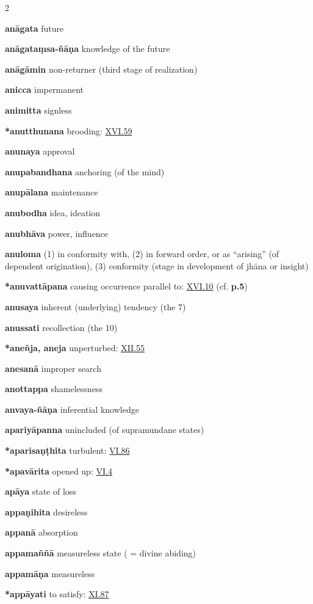 \begin{multicols}{2}
\begin{vismHanging}
\par\textbf{anāgata} future
\par\textbf{anāgataṃsa-ñāṇa} knowledge of the future 
\par\textbf{anāgāmin} non-returner (third stage of realization) 
\par\textbf{anicca} impermanent
\par\textbf{animitta} signless 
\par\textbf{*anutthunana} brooding: \hyperlink{XVI.59}{XVI.59}{} 
\par\textbf{anunaya} approval
\par\textbf{anupabandhana} anchoring (of the mind) 
\par\textbf{anupālana} maintenance
\par\textbf{anubodha} idea, ideation
\par\textbf{anubhāva} power, influence
\par\textbf{anuloma} (1) in conformity with, (2) in forward order, or as “arising” (of dependent origination), (3) conformity (stage in development of jhāna or insight) 
\par\textbf{*anuvattāpana} causing occurrence parallel to: \hyperlink{XVI.10}{XVI.10}{} (cf. \textbf{\cite{Dhs} p.5}) 
\par\textbf{anusaya} inherent (underlying) tendency (the 7) 
\par\textbf{anussati} recollection (the 10)
\par\textbf{*aneñja, aneja} unperturbed: \hyperlink{XII.55}{XII.55}{}
\par\textbf{anesanā} improper search
\par\textbf{anottappa} shamelessness
\par\textbf{anvaya-ñāṇa} inferential knowledge
\par\textbf{apariyāpanna} unincluded (of supramundane states) 
\par\textbf{*aparisaṇṭhita} turbulent: \hyperlink{VI.86}{VI.86}{}
\par\textbf{*apavārita} opened up: \hyperlink{VI.4}{VI.4}{}
\par\textbf{apāya} state of loss
\par\textbf{appaṇihita} desireless
\par\textbf{appanā} absorption
\par\textbf{appamaññā} measureless state ( = divine abiding) 
\par\textbf{appamāṇa} measureless
\par\textbf{*appāyati} to satisfy: \hyperlink{XI.87}{XI.87}{}

\end{vismHanging}
\end{multicols}
